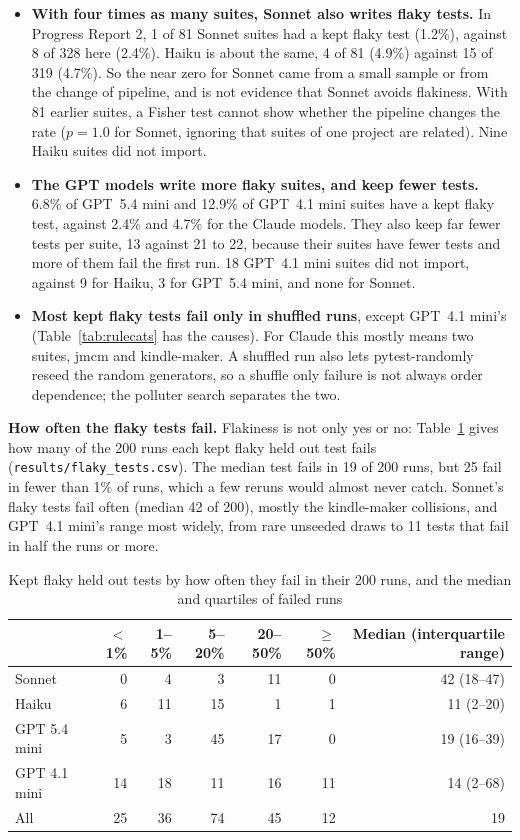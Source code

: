 \begin{itemize}
\item \textbf{With four times as many suites, Sonnet also writes flaky tests.} In Progress Report 2, 1 of 81 Sonnet suites had a kept flaky test (1.2\%), against 8 of 328 here (2.4\%). Haiku is about the same, 4 of 81 (4.9\%) against 15 of 319 (4.7\%). So the near zero for Sonnet came from a small sample or from the change of pipeline, and is not evidence that Sonnet avoids flakiness. With 81 earlier suites, a Fisher test cannot show whether the pipeline changes the rate ($p = 1.0$ for Sonnet, ignoring that suites of one project are related). Nine Haiku suites did not import.
\item \textbf{The GPT models write more flaky suites, and keep fewer tests.} 6.8\% of GPT~5.4 mini and 12.9\% of GPT~4.1 mini suites have a kept flaky test, against 2.4\% and 4.7\% for the Claude models. They also keep far fewer tests per suite, 13 against 21 to 22, because their suites have fewer tests and more of them fail the first run. 18 GPT~4.1 mini suites did not import, against 9 for Haiku, 3 for GPT~5.4 mini, and none for Sonnet.
\item \textbf{Most kept flaky tests fail only in shuffled runs}, except GPT~4.1 mini's (Table~\ref{tab:rulecats} has the causes). For Claude this mostly means two suites, jmcm and kindle-maker. A shuffled run also lets pytest-randomly reseed the random generators, so a shuffle only failure is not always order dependence; the polluter search separates the two.
\end{itemize}

\textbf{How often the flaky tests fail.} Flakiness is not only yes or no: Table~\ref{tab:failfreq} gives how many of the 200 runs each kept flaky held out test fails (\texttt{results/flaky\_tests.csv}). The median test fails in 19 of 200 runs, but 25 fail in fewer than 1\% of runs, which a few reruns would almost never catch. Sonnet's flaky tests fail often (median 42 of 200), mostly the kindle-maker collisions, and GPT~4.1 mini's range most widely, from rare unseeded draws to 11 tests that fail in half the runs or more.

\begin{table}[htbp]
\caption{Kept flaky held out tests by how often they fail in their 200 runs, and the median and quartiles of failed runs}
\label{tab:failfreq}
\small
\setlength{\tabcolsep}{2.5pt}
\begin{tabular}{lrrrrrr}
\toprule
 & $<$1\% & 1--5\% & 5--20\% & 20--50\% & $\ge$50\% & Median (interquartile range) \\
\midrule
Sonnet & 0 & 4 & 3 & 11 & 0 & 42 (18--47) \\
Haiku & 6 & 11 & 15 & 1 & 1 & 11 (2--20) \\
GPT 5.4 mini & 5 & 3 & 45 & 17 & 0 & 19 (16--39) \\
GPT 4.1 mini & 14 & 18 & 11 & 16 & 11 & 14 (2--68) \\
\midrule
All & 25 & 36 & 74 & 45 & 12 & 19 \\
\bottomrule
\end{tabular}
\end{table}

